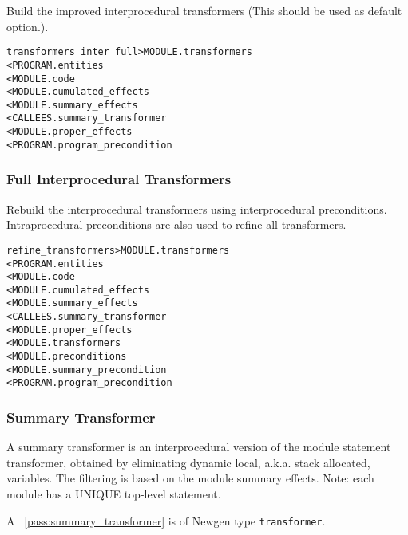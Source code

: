 \documentclass[a4paper]{report}
\newenvironment{PipsMake}{\begin{alltt}}{\end{alltt}}
\newcommand{\PipsPassRef}[1]{\texttt{\detokenize{#1}}~\ref{pass:#1}}
\newenvironment{PipsPass}[1]{\label{pass:#1}}{}
\begin{document}
\begin{PipsPass}{transformers_inter_full}
Build the improved interprocedural transformers (This should be used
as default option.).
\end{PipsPass}

\begin{PipsMake}
transformers_inter_full         > MODULE.transformers
        < PROGRAM.entities
        < MODULE.code
        < MODULE.cumulated_effects
        < MODULE.summary_effects
        < CALLEES.summary_transformer
        < MODULE.proper_effects
        < PROGRAM.program_precondition
\end{PipsMake}

\subsubsection{Full Interprocedural Transformers}

\begin{PipsPass}{refine_transformers}
Rebuild the interprocedural transformers using interprocedural
preconditions. Intraprocedural preconditions are also used to refine all
transformers.
\end{PipsPass}

\begin{PipsMake}
refine_transformers         > MODULE.transformers
        < PROGRAM.entities
        < MODULE.code
        < MODULE.cumulated_effects
        < MODULE.summary_effects
        < CALLEES.summary_transformer
        < MODULE.proper_effects
        < MODULE.transformers
        < MODULE.preconditions
        < MODULE.summary_precondition
        < PROGRAM.program_precondition
\end{PipsMake}

\subsubsection{Summary Transformer}
\label{subsubsection-summary-transformer}

\begin{PipsPass}{summary_transformer}
A summary transformer is an interprocedural version of the module
statement transformer, obtained by eliminating dynamic local,
a.k.a. stack allocated, variables. The filtering is based on the
module summary effects.
\end{PipsPass}
Note: each module has a UNIQUE top-level
statement.

A \PipsPassRef{summary_transformer} is of Newgen type \texttt{transformer}.
\end{document}
